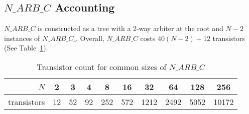 \documentclass[aer.tex]{subfiles}
\begin{document}
\subsection{$N\_ARB\_C$ Accounting}

$N\_ARB\_C$ is constructed as a tree with a 2-way arbiter at the root and $N-2$ instances of $N\_ARB\_C\_$. Overall, $N\_ARB\_C$ costs $40(N-2)+12$ transistors (See Table~\ref{tab:cheap_n_arb_cost}).

\begin{table}[ht]
  \centering
  \begin{tabular}{|r|c|c|c|c|c|c|c|c|c|}
    \hline
    $N$ & 2 & 3 & 4 & 8 & 16 & 32 & 64 & 128 & 256 \\
    \hline
    transistors & 12 & 52 & 92 & 252 & 572 & 1212 & 2492 & 5052 & 10172 \\
    \hline
  \end{tabular}
  \caption{\label{tab:cheap_n_arb_cost}Transistor count for common sizes of $N\_ARB\_C$}
\end{table}

\end{document}
